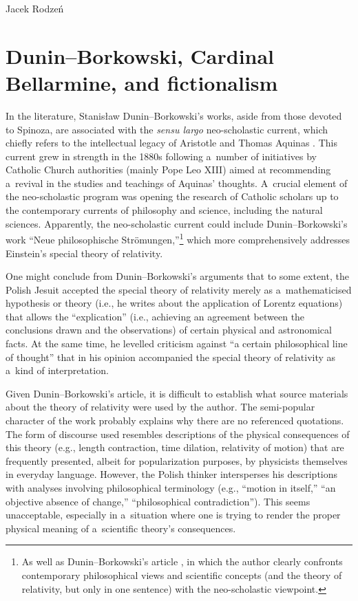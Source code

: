 \begin{artengenv}{Jacek Rodzeń}
\section{Dunin–Borkowski, Cardinal Bellarmine, and fictionalism}
In the literature, Stanisław Dunin–Borkowski's works, aside from those devoted to Spinoza, are associated with the \textit{sensu largo} neo-scholastic current, which chiefly refers to the intellectual legacy of Aristotle and Thomas Aquinas
\parencites[][p.305]{bruehl_implications_1921}[][pp.119–123]{benk_moderne_2000}. %
 This current grew in strength in the 1880s following a~number of initiatives by Catholic Church authorities (mainly Pope Leo XIII) aimed at recommending a~revival in the studies and teachings of Aquinas' thoughts. A~crucial element of the neo-scholastic program was opening the research of Catholic scholars up to the contemporary currents of philosophy and science, including the natural sciences. Apparently, the neo-scholastic current could include Dunin–Borkowski's work ``Neue philosophische Strömungen,''\footnote{As well as Dunin–Borkowski's article 
\parencite*[][]{dunin-borkowski_auf_1921}, %
 in which the author clearly confronts contemporary philosophical views and scientific concepts (and the theory of relativity, but only in one sentence) with the neo-scholastic viewpoint.} which more comprehensively addresses Einstein's special theory of relativity.

One might conclude from Dunin–Borkowski's arguments that to some extent, the Polish Jesuit accepted the special theory of relativity merely as a~mathematicised hypothesis or theory (i.e., he writes about the application of Lorentz equations) that allows the ``explication'' (i.e., achieving an agreement between the conclusions drawn and the observations) of certain physical and astronomical facts. At the same time, he levelled criticism against ``a certain philosophical line of thought'' that in his opinion accompanied the special theory of relativity as a~kind of interpretation.

Given Dunin–Borkowski's article, it is difficult to establish what source materials about the theory of relativity were used by the author. The semi-popular character of the work probably explains why there are no referenced quotations. The form of discourse used resembles descriptions of the physical consequences of this theory (e.g., length contraction, time dilation, relativity of motion) that are frequently presented, albeit for popularization purposes, by physicists themselves in everyday language. However, the Polish thinker intersperses his descriptions with analyses involving philosophical terminology (e.g., ``motion in itself,'' ``an objective absence of change,'' ``philosophical contradiction''). This seems unacceptable, especially in a~situation where one is trying to render the proper physical meaning of a~scientific theory's consequences.


\end{artengenv}
